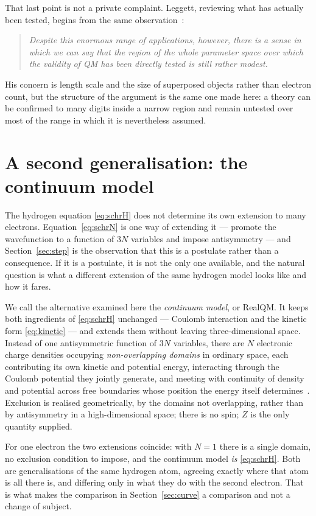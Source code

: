 \documentclass[11pt]{article}
\begin{document}
That last point is not a private complaint. Leggett, reviewing what has actually been tested,
begins from the same observation~\cite[p.~R415]{Leggett2002}:
\begin{quote}
\emph{Despite this enormous range of applications, however, there is a sense in which we can say
that the region of the whole parameter space over which the validity of QM has been directly tested
is still rather modest.}
\end{quote}
His concern is length scale and the size of superposed objects rather than electron count, but the
structure of the argument is the same one made here: a theory can be confirmed to many digits
inside a narrow region and remain untested over most of the range in which it is nevertheless
assumed.

\section{A second generalisation: the continuum model}\label{sec:realqm}

The hydrogen equation \eqref{eq:schrH} does not determine its own extension to many electrons.
Equation~\eqref{eq:schrN} is one way of extending it --- promote the wavefunction to a function of
$3N$ variables and impose antisymmetry --- and Section~\ref{sec:step} is the observation that this
is a postulate rather than a consequence. If it is a postulate, it is not the only one available,
and the natural question is what a different extension of the same hydrogen model looks like and
how it fares.

We call the alternative examined here the \emph{continuum model}, or RealQM. It keeps both
ingredients of \eqref{eq:schrH} unchanged --- Coulomb interaction and the kinetic form
\eqref{eq:kinetic} --- and extends them without leaving three-dimensional space. Instead of one
antisymmetric function of $3N$ variables, there are $N$ electronic charge densities occupying
\emph{non-overlapping domains} in ordinary space, each contributing its own kinetic and potential
energy, interacting through the Coulomb potential they jointly generate, and meeting with
continuity of density and potential across free boundaries whose position the energy itself
determines~\cite{Johnson-RealQM}. Exclusion is realised geometrically, by the domains not
overlapping, rather than by antisymmetry in a high-dimensional space; there is no spin; $Z$ is the
only quantity supplied.

For one electron the two extensions coincide: with $N=1$ there is a single domain, no exclusion
condition to impose, and the continuum model \emph{is} \eqref{eq:schrH}. Both are generalisations
of the same hydrogen atom, agreeing exactly where that atom is all there is, and differing only in
what they do with the second electron. That is what makes the comparison in
Section~\ref{sec:curve} a comparison and not a change of subject.
\end{document}
